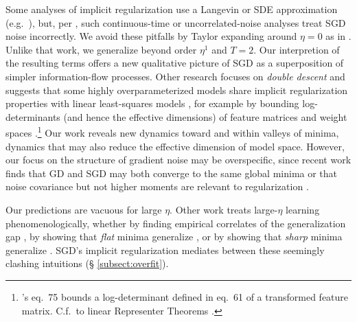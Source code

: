             Some analyses of implicit regularization use a Langevin or SDE
            approximation (e.g.\ \citet{ch18,zh19}), but, per \citet{ya19a},
            such continuous-time or uncorrelated-noise analyses treat SGD noise
            incorrectly.
            We avoid these pitfalls by Taylor expanding around $\eta=0$ as in
            \citet{ro18}.  Unlike that work, we generalize beyond order $\eta^1$
            and $T=2$.  %
            Our interpretion of the resulting
            terms offers a new qualitative picture of SGD as a superposition of
            simpler information-flow processes.
            Other research focuses on \emph{double descent} and suggests that
            some highly overparameterized models share implicit regularization
            properties with linear least-squares models \citep{be19}, for
            example by bounding log-determinants (and hence the effective
            dimensions) of feature matrices and weight spaces
            \citep{me20}.\footnote{
                \cite{me20}'s eq.\ 75 bounds a log-determinant defined in eq.\
                61 of a transformed feature matrix.  C.f.\ to linear
                Representer Theorems \citep{mo18b}.
            }
            Our work reveals new dynamics toward and within valleys of minima,
            dynamics that may also reduce the effective dimension of model space.
            However, our focus on the structure of gradient noise may be
            overspecific, since recent work finds that GD and SGD may both
            converge to the same global minima \citep{zo20} or that
            noise covariance but not higher moments are relevant to
            regularization \citep{wu20}. 

        
            Our predictions are vacuous for large $\eta$.  Other work treats
            large-$\eta$ learning phenomenologically, whether by finding
            empirical correlates of the generalization gap \citep{li18}, by
            showing that \emph{flat} minima generalize \citep{ho17,ke17,wa18},
            or by showing that \emph{sharp} minima generalize
            \citep{st56,di17,wu18}.  SGD's implicit regularization mediates
            between these seemingly clashing intuitions (\S
            \ref{subsect:overfit}).
            
